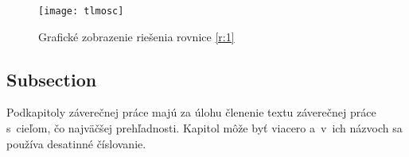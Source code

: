\begin{figure}[ht!]
\centering
\texttt{[image: tlmosc]}
\caption{Grafické zobrazenie riešenia rovnice \ref{r:1}}\label{o:2}
\end{figure}



\subsection{Subsection}
Podkapitoly záverečnej práce majú za úlohu členenie textu záverečnej
práce s~cieľom, čo najväčšej prehľadnosti. Kapitol môže byť viacero
a~v~ich názvoch sa používa desatinné číslovanie.